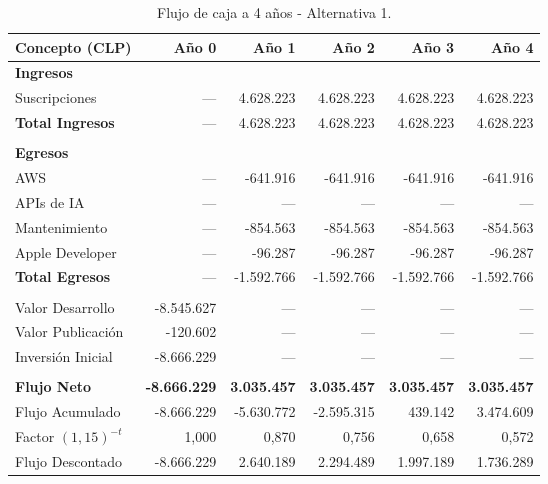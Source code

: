 \documentclass[12pt]{article}
\begin{document}
\begin{table}[h!]
    \centering
    \renewcommand{\arraystretch}{1.3}
    \footnotesize
    \begin{tabular}{|m{3.2cm}|r|r|r|r|r|}
        \hline
        \rowcolor[HTML]{EFEFEF}
        \textbf{Concepto (CLP)} & \textbf{Año 0} & \textbf{Año 1} & \textbf{Año 2} & \textbf{Año 3} & \textbf{Año 4} \\ \hline
        
        \textbf{Ingresos } &&&&&\\ \hline
        Suscripciones & --- & 4.628.223 & 4.628.223 & 4.628.223 & 4.628.223 \\ \hline
        \rowcolor[HTML]{E8F5E9}
        \textbf{Total Ingresos} & --- & 4.628.223 & 4.628.223 & 4.628.223 & 4.628.223 \\ \hline
        & & & & & \\ \hline
        \textbf{Egresos} & & & & & \\ \hline
        AWS & --- & -641.916 & -641.916 & -641.916 & -641.916 \\ \hline
        APIs de IA & --- & --- & --- & --- & --- \\ \hline
        Mantenimiento & --- & -854.563 & -854.563 & -854.563 & -854.563 \\ \hline
        Apple Developer & --- & -96.287 & -96.287 & -96.287 & -96.287 \\ \hline
        \rowcolor[HTML]{F3E5F5}
        \textbf{Total Egresos} & --- & -1.592.766 & -1.592.766 & -1.592.766 & -1.592.766 \\ \hline
        & & & & & \\ \hline
        Valor Desarrollo & -8.545.627 & --- & --- & --- & --- \\ \hline
        Valor Publicación & -120.602 & --- & --- & --- & --- \\ \hline
        \rowcolor[HTML]{F3E5F5} 
        Inversión Inicial & -8.666.229 & --- & --- & --- & --- \\ \hline
        & & & & & \\ \hline
        \rowcolor[HTML]{E8F5E9}
        \textbf{Flujo Neto} & \textbf{-8.666.229} & \textbf{3.035.457} & \textbf{3.035.457} & \textbf{3.035.457} & \textbf{3.035.457} \\ \hline
        Flujo Acumulado & -8.666.229 & -5.630.772 & -2.595.315 & 439.142 & 3.474.609 \\ \hline
        \rowcolor[HTML]{F3E5F5}
        Factor $(1{,}15)^{-t}$ & 1,000 & 0,870 & 0,756 & 0,658 & 0,572 \\ \hline
        \rowcolor[HTML]{F3E5F5}
        Flujo Descontado & -8.666.229 & 2.640.189 & 2.294.489 & 1.997.189 & 1.736.289 \\ \hline
    \end{tabular}
    \caption{Flujo de caja a 4 años - Alternativa 1.}
    \label{tab:flujo_alt1}
\end{table}
\end{document}
